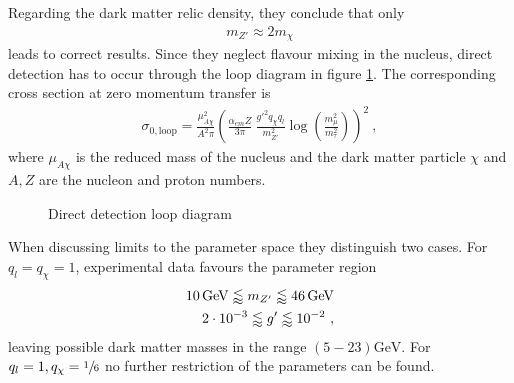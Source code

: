 \begin{minipage}{0.67\textwidth}
	Regarding the dark matter relic density, they conclude that only
	\begin{align}\label{eq:Relic}
	m_{Z'}\approx 2m_\chi
	\end{align}
	leads to correct results. Since they neglect flavour mixing in the nucleus, direct detection has to occur through the loop diagram in figure \ref{fig:Loop}. The corresponding cross section at zero momentum transfer is
	\begin{align}\label{eq:Loop}
	\sigma_{0,\text{loop}} = \frac{\mu_{A\chi}^2}{A^2\pi}\left(\frac{\alpha_{em}Z}{3\pi}\ \frac{g'^2q_\chi q_l}{m_{Z'}^2}\log\left(\frac{m_\mu^2}{m_\tau^2}\right)\right)^2 \ ,
	\end{align}
	where $\mu_{A\chi}$ is the reduced mass of the nucleus and the dark matter particle $\chi$ and $A,Z$ are the nucleon and proton numbers.
\end{minipage} \hfill
\begin{minipage}{0.32\textwidth}
	\begin{figure}[H]
		\centering
		
		\captionsetup{width=.9\textwidth}
		\caption{Direct detection loop diagram}
		\label{fig:Loop}
	\end{figure}
\end{minipage}
%
%	


When discussing limits to the parameter space they distinguish two cases. For $q_l=q_\chi=1$, experimental data favours the parameter region
\begin{align}\label{eq:Boundg}
	\SI{10}{\giga\electronvolt}\lessapprox m_{Z'}\lessapprox\SI{46}{\giga\electronvolt}\notag \\
	\SI{2e-3}{}\lessapprox g'\lessapprox\SI{e-2}{} \ ,
\end{align}
leaving possible dark matter masses in the range $(5-23)\si{\giga\electronvolt}$. For $q_l=1,q_\chi=\sfrac{1}{6}$ no further restriction of the parameters can be found.

